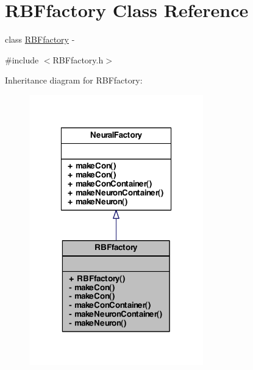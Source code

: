 \hypertarget{class_r_b_ffactory}{
\section{RBFfactory Class Reference}
\label{class_r_b_ffactory}
}


class \hyperlink{class_r_b_ffactory}{RBFfactory} -\/  




{\ttfamily \#include $<$RBFfactory.h$>$}



Inheritance diagram for RBFfactory:\nopagebreak
\begin{figure}[H]
\begin{center}
\leavevmode
\includegraphics[width=214pt]{class_r_b_ffactory__inherit__graph}
\end{center}
\end{figure}


